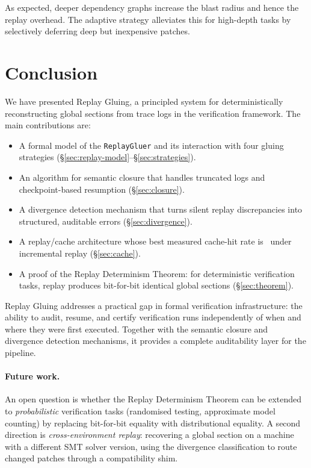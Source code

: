 \documentclass[11pt]{article}
\begin{document}
As expected, deeper dependency graphs increase the blast radius and
hence the replay overhead.  The adaptive strategy alleviates this for
high-depth tasks by selectively deferring deep but inexpensive patches.


\section{Conclusion}
\label{sec:conclusion}

We have presented Replay Gluing, a principled system for
deterministically reconstructing global sections from trace logs in the
\JuGeo{} verification framework.  The main contributions are:

\begin{itemize}
\item A formal model of the \texttt{ReplayGluer} and its interaction
  with four gluing strategies (\S\ref{sec:replay-model}--\S\ref{sec:strategies}).
\item An algorithm for semantic closure that handles truncated logs and
  checkpoint-based resumption (\S\ref{sec:closure}).
\item A divergence detection mechanism that turns silent replay
  discrepancies into structured, auditable errors (\S\ref{sec:divergence}).
\item A replay/cache architecture whose best measured cache-hit rate is
  \ppXLIncCacheHit\ under incremental replay (\S\ref{sec:cache}).
\item A proof of the Replay Determinism Theorem: for deterministic
  verification tasks, replay produces bit-for-bit identical global
  sections (\S\ref{sec:theorem}).
\end{itemize}

Replay Gluing addresses a practical gap in formal verification
infrastructure: the ability to audit, resume, and certify
verification runs independently of when and where they were first
executed.  Together with the semantic closure and divergence detection
mechanisms, it provides a complete auditability layer for the \JuGeo{}
pipeline.

\paragraph{Future work.}
An open question is whether the Replay Determinism Theorem can be
extended to \emph{probabilistic} verification tasks (randomised testing,
approximate model counting) by replacing bit-for-bit equality with
distributional equality.  A second direction is \emph{cross-environment
replay}: recovering a global section on a machine with a different SMT
solver version, using the divergence classification to route changed
patches through a compatibility shim.
\end{document}
